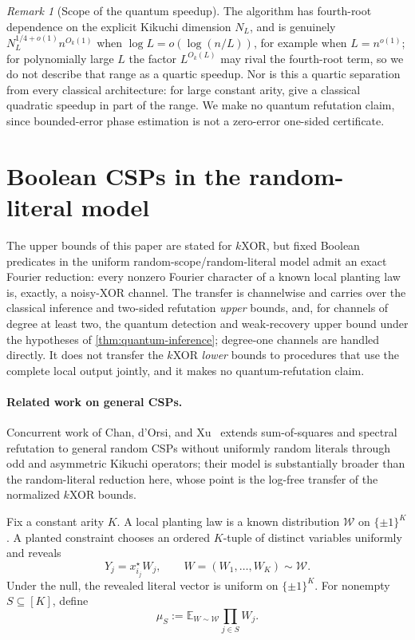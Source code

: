 \documentclass[11pt]{article}
\theoremstyle{definition}
\theoremstyle{remark}
\newtheorem{remark}[remark]{Remark}
\newcommand{\E}{\mathbb E}
\newcommand{\1}{\mathbf 1}
\newcommand{\cW}{\mathcal W}
\numberwithin{equation}{section}
\begin{document}
\begin{remark}[Scope of the quantum speedup]\label{rem:quantum-scope}
The algorithm has fourth-root dependence on the explicit Kikuchi
dimension $N_L$, and is genuinely $N_L^{1/4+o(1)}n^{O_k(1)}$ when
$\log L=o(\log(n/L))$, for example when $L=n^{o(1)}$; for polynomially
large $L$ the factor $L^{O_k(L)}$ may rival the fourth-root term, so we
do not describe that range as a quartic speedup.  Nor is this a quartic
separation from every classical architecture: for large constant arity,
\cite{GHOS} give a classical quadratic speedup in part of the range.
We make no quantum refutation claim, since bounded-error phase
estimation is not a zero-error one-sided certificate.
\end{remark}

\section{Boolean CSPs in the random-literal model}\label{sec:boolean-csp}

The upper bounds of this paper are stated for $k$XOR, but fixed Boolean
predicates in the uniform random-scope/random-literal model admit an
exact Fourier reduction: every nonzero Fourier character of a known
local planting law is, exactly, a noisy-XOR channel.  The transfer is
channelwise and carries over the classical inference and two-sided
refutation \emph{upper} bounds, and, for channels of degree at least
two, the quantum detection and weak-recovery upper bound under the
hypotheses of \cref{thm:quantum-inference}; degree-one channels are
handled directly.  It does not transfer the $k$XOR \emph{lower} bounds
to procedures that use the complete local output jointly, and it makes
no quantum-refutation claim.

\paragraph{Related work on general CSPs.}
Concurrent work of Chan, d'Orsi, and Xu~\cite{ChanDOrsiXu} extends
sum-of-squares and spectral refutation to general random CSPs without
uniformly random literals through odd and asymmetric Kikuchi operators;
their model is substantially broader than the random-literal reduction
here, whose point is the log-free transfer of the normalized $k$XOR
bounds.

Fix a constant arity $K$.  A local planting law is a known distribution
$\cW$ on $\{\pm1\}^K$.  A planted constraint chooses an ordered $K$-tuple
of distinct variables uniformly and reveals
\begin{equation}\label{eq:csp-observation}
 Y_j=x_{i_j}^\star W_j,
 \qquad W=(W_1,\ldots,W_K)\sim\cW.
\end{equation}
Under the null, the revealed literal vector is uniform on $\{\pm1\}^K$.
For nonempty $S\subseteq[K]$, define
\begin{equation}\label{eq:csp-fourier-bias}
 \mu_S:=\E_{W\sim\cW}\prod_{j\in S}W_j.
\end{equation}
\end{document}
